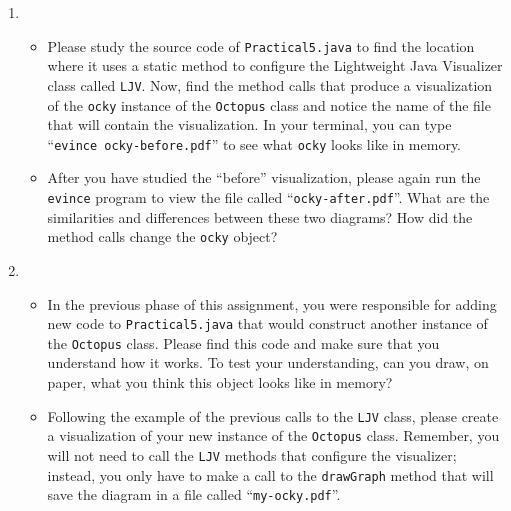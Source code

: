 \begin{enumerate}
\item 

\begin{itemize}


  \item Please study the source code of {\tt Practical5.java} to find the location where it uses a static method to
    configure the Lightweight Java Visualizer class called {\tt LJV}. Now, find the method calls that produce a
    visualization of the {\tt ocky} instance of the {\tt Octopus} class and notice the name of the file that will
    contain the visualization. In your terminal, you can type ``{\tt evince ocky-before.pdf}'' to see what {\tt ocky}
    looks like in memory.

  \item After you have studied the ``before'' visualization, please again run the {\tt evince} program to view the file
    called ``{\tt ocky-after.pdf}''. What are the similarities and differences between these two diagrams? How did the
    method calls change the {\tt ocky} object?

\end{itemize} 

\item
  \begin{itemize}
    
    \item In the previous phase of this assignment, you were responsible for adding new code to {\tt Practical5.java}
      that would construct another instance of the {\tt Octopus} class.  Please find this code and make sure that you
      understand how it works. To test your understanding, can you draw, on paper, what you think this object looks like
      in memory?
  
    \item Following the example of the previous calls to the {\tt LJV} class, please create a visualization of your
      new instance of the {\tt Octopus} class. Remember, you will not need to call the {\tt LJV} methods that configure
      the visualizer; instead, you only have to make a call to the {\tt drawGraph} method that will save the diagram in
      a file called ``{\tt my-ocky.pdf}''.

  \end{itemize}
\end{enumerate}

